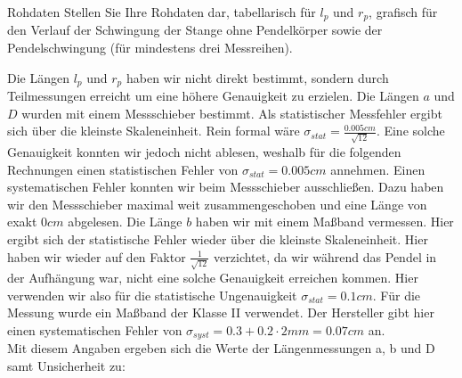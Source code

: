 \begin{aufgabe}{Rohdaten}
  Stellen Sie Ihre Rohdaten dar, tabellarisch für $l_p$ und $r_p$,
  grafisch für den Verlauf der Schwingung der Stange ohne Pendelkörper
  sowie der Pendelschwingung (für mindestens drei Messreihen).
\end{aufgabe}
Die Längen $l_p$ und $r_p$ haben wir nicht direkt bestimmt, sondern durch Teilmessungen erreicht um eine höhere Genauigkeit zu erzielen. Die Längen $a$ und $D$ wurden mit einem Messschieber bestimmt. Als statistischer Messfehler ergibt sich über die kleinste Skaleneinheit. Rein formal wäre $\sigma_{stat} = \frac{0.005cm}{\sqrt{12}}$. Eine solche Genauigkeit konnten wir jedoch nicht ablesen, weshalb für die folgenden Rechnungen einen statistischen Fehler von $\sigma_{stat} = 0.005cm$ annehmen. Einen systematischen Fehler konnten wir beim Messschieber ausschließen. Dazu haben wir den Messschieber maximal weit zusammengeschoben und eine Länge von exakt $0cm $ abgelesen. Die Länge $b$ haben wir mit einem Maßband vermessen. Hier ergibt sich der statistische Fehler wieder über die kleinste Skaleneinheit. Hier haben wir wieder auf den Faktor $\frac{1}{\sqrt{12}}$ verzichtet, da wir während das Pendel in der Aufhängung war, nicht eine solche Genauigkeit erreichen kommen. Hier verwenden wir also für die statistische Ungenauigkeit $\sigma_{stat} = 0.1cm$. Für die Messung wurde ein Maßband der Klasse II verwendet. Der Hersteller gibt hier einen systematischen Fehler von $\sigma_{syst}=0.3+0.2\cdot2 mm = 0.07cm$ an.\\
Mit diesem Angaben ergeben sich die Werte der Längenmessungen a, b und D samt Unsicherheit zu:\\
